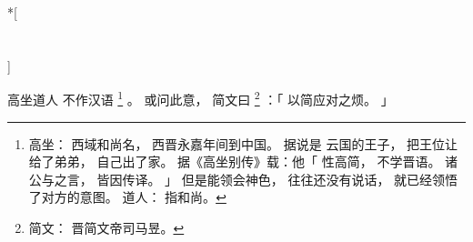
\switchcolumn[0]*[\section{}]

高坐道人
不作汉语%
\footnote{%
    高坐：
        西域和尚名，
        西晋永嘉年间到中国。
        据说是
        云国的王子，
        把王位让给了弟弟，
        自己出了家。
        据《高坐别传》载：他「
            性高简，
            不学晋语。
            诸公与之言，
            皆因传译。
        」
        但是能领会神色，
        往往还没有说话，
        就已经领悟了对方的意图。
    道人：
        指和尚。
}%
。
或问此意，
简文曰%
\footnote{%
    简文：
        晋简文帝司马昱。
}%
：「
    以简应对之烦。
」

\switchcolumn


